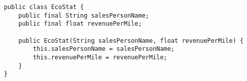 \begin{verbatim}
    public class EcoStat {
        public final String salesPersonName;
        public final float revenuePerMile;
    
        public EcoStat(String salesPersonName, float revenuePerMile) {
            this.salesPersonName = salesPersonName;
            this.revenuePerMile = revenuePerMile;
        }
    }
\end{verbatim}